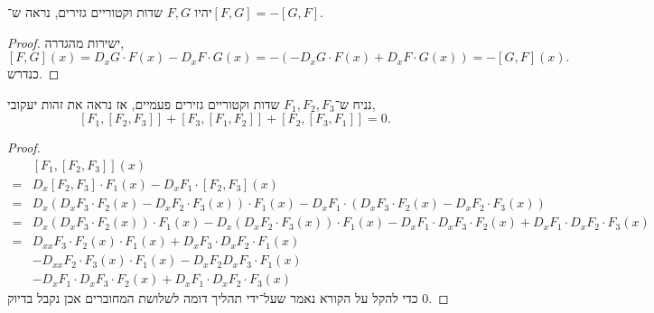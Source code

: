 \subquestion{}
יהיו $F, G$ שדות וקטוריים גזירים,
נראה ש־$[F, G] = - [G, F]$.
\begin{proof}
	ישירות מהגדרה,
	\[
		[F, G](x)
		= D_x G \cdot F(x) - D_x F \cdot G(x)
		= -(-D_x G \cdot F(x) + D_x F \cdot G(x))
		= -[G, F](x)
	.\]
	כנדרש.
\end{proof}

\subquestion{}
נניח ש־$F_1, F_2, F_3$ שדות וקטוריים גזירים פעמיים, אז נראה את זהות יעקובי,
\[
	[F_1, [F_2, F_3]] + [F_3, [F_1, F_2]] + [F_2, [F_3, F_1]] = 0
.\]
\begin{proof}
	\begin{align*}
		& [F_1, [F_2, F_3]](x) \\
		= & D_x [F_2, F_3] \cdot F_1(x) - D_x F_1 \cdot [F_2, F_3](x) \\
		= & D_x (D_x F_3 \cdot F_2(x) - D_x F_2 \cdot F_3(x)) \cdot F_1(x) - D_x F_1 \cdot (D_x F_3 \cdot F_2(x) - D_x F_2 \cdot F_3(x)) \\
		= & D_x (D_x F_3 \cdot F_2(x)) \cdot F_1(x) - D_x (D_x F_2 \cdot F_3(x)) \cdot F_1(x) - D_x F_1 \cdot D_x F_3 \cdot F_2(x) + D_x F_1 \cdot D_x F_2 \cdot F_3(x) \\
		= & D_{x x} F_3 \cdot F_2(x) \cdot F_1(x) + D_x F_3 \cdot D_x F_2 \cdot F_1(x) \\
		  & - D_{x x} F_2 \cdot F_3(x) \cdot F_1(x) - D_x F_2 D_x F_3 \cdot F_1(x) \\
		  & - D_x F_1 \cdot D_x F_3 \cdot F_2(x) + D_x F_1 \cdot D_x F_2 \cdot F_3(x)
	\end{align*}
	כדי להקל על הקורא נאמר שעל־ידי תהליך דומה לשלושת המחוברים אכן נקבל בדיוק $0$.
\end{proof}

